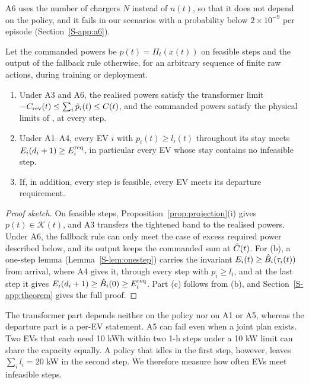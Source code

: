 A6 uses the number of chargers $N$ instead of $n(t)$, so that it does not depend on the policy, and it fails in our scenarios with a probability below $2\times10^{-9}$ per episode (Section~\ref{S-app:a6}).

\begin{theorem}\label{thm:invariance}
Let the commanded powers be $p(t)=\Pi_t(x(t))$ on feasible steps and the output of the fallback rule otherwise, for an arbitrary sequence of finite raw actions, during training or deployment.
\begin{enumerate}
\item[(a)] Under A3 and A6, the realised powers satisfy the transformer limit $-C_{\mathrm{rev}}(t)\le\sum_i\tilde p_i(t)\le C(t)$, and the commanded powers satisfy the physical limits of , at every step.
\item[(b)] Under A1--A4, every EV $i$ with $p_i(t)\ge l_i(t)$ throughout its stay meets $E_i(d_i+1)\ge E^{\mathrm{req}}_i$, in particular every EV whose stay contains no infeasible step.
\item[(c)] If, in addition, every step is feasible, every EV meets its departure requirement.
\end{enumerate}
\end{theorem}

\begin{proof}[Proof sketch]
On feasible steps, Proposition~\ref{prop:projection}(i) gives $p(t)\in\mathcal K(t)$, and A3 transfers the tightened band to the realised powers.
Under A6, the fallback rule can only meet the case of excess required power described below, and its output keeps the commanded sum at $\tilde C(t)$.
For (b), a one-step lemma (Lemma~\ref{S-lem:onestep}) carries the invariant $E_i(t)\ge\hat B_i(\tau_i(t))$ from arrival, where A4 gives it, through every step with $p_i\ge l_i$, and at the last step it gives $E_i(d_i+1)\ge\hat B_i(0)\ge E^{\mathrm{req}}_i$.
Part (c) follows from (b), and Section~\ref{S-app:theorem} gives the full proof.
\end{proof}

The transformer part depends neither on the policy nor on A1 or A5, whereas the departure part is a per-EV statement.
A5 can fail even when a joint plan exists.
Two EVs that each need 10 kWh within two 1-h steps under a 10 kW limit can share the capacity equally.
A policy that idles in the first step, however, leaves $\sum_il_i=20$ kW in the second step.
We therefore measure how often EVs meet infeasible steps.

